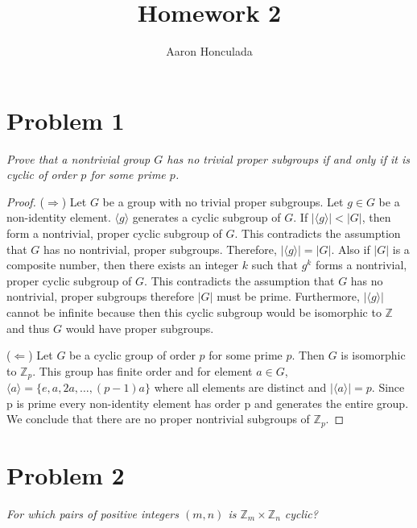 \documentclass{article}
\title{Homework 2}
\author{Aaron Honculada}
\date{\monthname[\month] \the\year}
\theoremstyle{plain} %
\theoremstyle{definition} %
\begin{document}
\maketitle

\section*{Problem 1}
\noindent\textit{Prove that a nontrivial group $G$ has no trivial proper subgroups if and only if
it is cyclic of order $p$ for some prime $p$.}

\begin{proof}
    ($\Rightarrow$)
    Let $G$ be a group with no trivial proper subgroups. Let $g \in G$ be a non-identity element.
    $\langle g \rangle$ generates a cyclic subgroup of $G$. If $|\langle g \rangle| < |G|$, then
    form a nontrivial, proper cyclic subgroup of $G$. This contradicts the assumption that $G$ has no
    nontrivial, proper subgroups. Therefore, $|\langle g \rangle| = |G|$. Also if $|G|$ is a 
    composite number, then there exists an integer $k$ such that $g^k$ forms a nontrivial, proper
    cyclic subgroup of $G$. This contradicts the assumption that $G$ has no nontrivial, proper subgroups therefore
    $|G|$ must be prime. Furthermore, $|\langle g \rangle|$ cannot be infinite because then this cyclic subgroup
    would be isomorphic to $\mathbb{Z}$ and thus $G$ would have proper subgroups.

    ($\Leftarrow$)
    Let $G$ be a cyclic group of order $p$ for some prime $p$. Then $G$ is isomorphic to $\mathbb{Z}_p$.
    This group has finite order and for element $a \in G$, $\langle a \rangle = \{e, a, 2a, \ldots, (p-1)a\}$
    where all elements are distinct and $|\langle a \rangle| = p$. Since p is prime every non-identity element has order p
    and generates the entire group.
    We conclude that there are no proper nontrivial subgroups of $\mathbb{Z}_p$.
    
\end{proof}

\section*{Problem 2}
\noindent\textit{For which pairs of positive integers $(m,n)$ is $\mathbb{Z}_m \times \mathbb{Z}_n$ cyclic?}
\end{document}

